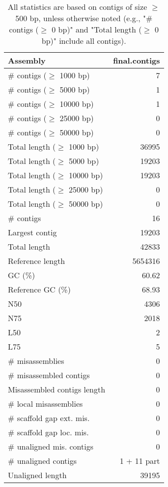 \documentclass[12pt,a4paper]{article}
\begin{document}
\begin{table}[ht]
\begin{center}
\caption{All statistics are based on contigs of size $\geq$ 500 bp, unless otherwise noted (e.g., "\# contigs ($\geq$ 0 bp)" and "Total length ($\geq$ 0 bp)" include all contigs).}
\begin{tabular}{|l*{1}{|r}|}
\hline
Assembly & final.contigs \\ \hline
\# contigs ($\geq$ 1000 bp) & 7 \\ \hline
\# contigs ($\geq$ 5000 bp) & 1 \\ \hline
\# contigs ($\geq$ 10000 bp) & 1 \\ \hline
\# contigs ($\geq$ 25000 bp) & 0 \\ \hline
\# contigs ($\geq$ 50000 bp) & 0 \\ \hline
Total length ($\geq$ 1000 bp) & 36995 \\ \hline
Total length ($\geq$ 5000 bp) & 19203 \\ \hline
Total length ($\geq$ 10000 bp) & 19203 \\ \hline
Total length ($\geq$ 25000 bp) & 0 \\ \hline
Total length ($\geq$ 50000 bp) & 0 \\ \hline
\# contigs & 16 \\ \hline
Largest contig & 19203 \\ \hline
Total length & 42833 \\ \hline
Reference length & 5654316 \\ \hline
GC (\%) & 60.62 \\ \hline
Reference GC (\%) & 68.93 \\ \hline
N50 & 4306 \\ \hline
N75 & 2018 \\ \hline
L50 & 2 \\ \hline
L75 & 5 \\ \hline
\# misassemblies & 0 \\ \hline
\# misassembled contigs & 0 \\ \hline
Misassembled contigs length & 0 \\ \hline
\# local misassemblies & 0 \\ \hline
\# scaffold gap ext. mis. & 0 \\ \hline
\# scaffold gap loc. mis. & 0 \\ \hline
\# unaligned mis. contigs & 0 \\ \hline
\# unaligned contigs & 1 + 11 part \\ \hline
Unaligned length & 39195 \\ \hline

\end{tabular}
\end{center}
\end{table}
\end{document}
